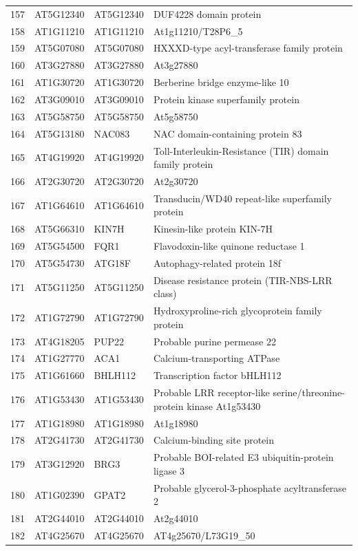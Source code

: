 \documentclass[11pt]{article}
\begin{document}
\begin{center}
\begin{tabular}{rlll}
157 & AT5G12340 & AT5G12340 & DUF4228 domain protein\\
158 & AT1G11210 & AT1G11210 & At1g11210/T28P6\_5\\
159 & AT5G07080 & AT5G07080 & HXXXD-type acyl-transferase family protein\\
160 & AT3G27880 & AT3G27880 & At3g27880\\
161 & AT1G30720 & AT1G30720 & Berberine bridge enzyme-like 10\\
162 & AT3G09010 & AT3G09010 & Protein kinase superfamily protein\\
163 & AT5G58750 & AT5G58750 & At5g58750\\
164 & AT5G13180 & NAC083 & NAC domain-containing protein 83\\
165 & AT4G19920 & AT4G19920 & Toll-Interleukin-Resistance (TIR) domain family protein\\
166 & AT2G30720 & AT2G30720 & At2g30720\\
167 & AT1G64610 & AT1G64610 & Transducin/WD40 repeat-like superfamily protein\\
168 & AT5G66310 & KIN7H & Kinesin-like protein KIN-7H\\
169 & AT5G54500 & FQR1 & Flavodoxin-like quinone reductase 1\\
170 & AT5G54730 & ATG18F & Autophagy-related protein 18f\\
171 & AT5G11250 & AT5G11250 & Disease resistance protein (TIR-NBS-LRR class)\\
172 & AT1G72790 & AT1G72790 & Hydroxyproline-rich glycoprotein family protein\\
173 & AT4G18205 & PUP22 & Probable purine permease 22\\
174 & AT1G27770 & ACA1 & Calcium-transporting ATPase\\
175 & AT1G61660 & BHLH112 & Transcription factor bHLH112\\
176 & AT1G53430 & AT1G53430 & Probable LRR receptor-like serine/threonine-protein kinase At1g53430\\
177 & AT1G18980 & AT1G18980 & At1g18980\\
178 & AT2G41730 & AT2G41730 & Calcium-binding site protein\\
179 & AT3G12920 & BRG3 & Probable BOI-related E3 ubiquitin-protein ligase 3\\
180 & AT1G02390 & GPAT2 & Probable glycerol-3-phosphate acyltransferase 2\\
181 & AT2G44010 & AT2G44010 & At2g44010\\
182 & AT4G25670 & AT4G25670 & AT4g25670/L73G19\_50\\

\end{tabular}
\end{center}
\end{document}
